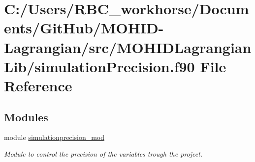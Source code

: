 \hypertarget{simulation_precision_8f90}{}\section{C\+:/\+Users/\+R\+B\+C\+\_\+workhorse/\+Documents/\+Git\+Hub/\+M\+O\+H\+I\+D-\/\+Lagrangian/src/\+M\+O\+H\+I\+D\+Lagrangian\+Lib/simulation\+Precision.f90 File Reference}
\label{simulation_precision_8f90}
\subsection*{Modules}
\begin{DoxyCompactItemize}
\item 
module \mbox{\hyperlink{namespacesimulationprecision__mod}{simulationprecision\+\_\+mod}}
\begin{DoxyCompactList}\small\item\em Module to control the precision of the variables trough the project. \end{DoxyCompactList}\end{DoxyCompactItemize}

